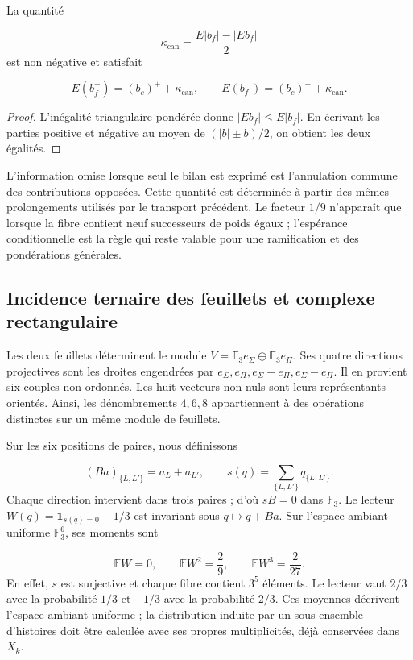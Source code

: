 \begin{proposition}
\label{iv:cont:cancelacion}
La quantité

\[
\kappa_{\mathrm{can}}=
\frac{E|b_f|-|Eb_f|}{2}
\]
est non négative et satisfait

\[
E(b_f^+)=(b_c)^++\kappa_{\mathrm{can}},
\qquad
E(b_f^-)=(b_c)^-+\kappa_{\mathrm{can}}.
\]
\end{proposition}
\begin{proof}
L'inégalité triangulaire pondérée donne \(|Eb_f|\leq E|b_f|\). En écrivant les parties positive et négative au moyen de \((|b|\pm b)/2\), on obtient les deux égalités.
\end{proof}

L’information omise lorsque seul le bilan est exprimé est l’annulation commune des contributions opposées. Cette quantité est déterminée à partir des mêmes prolongements utilisés par le transport précédent. Le facteur \(1/9\) n’apparaît que lorsque la fibre contient neuf successeurs de poids égaux ; l’espérance conditionnelle est la règle qui reste valable pour une ramification et des pondérations générales.

\subsection{Incidence ternaire des feuillets et complexe rectangulaire}
\label{iv:cont:incidencia-rectangular}
Les deux feuillets déterminent le module \(V=\mathbb F_3e_\Sigma\oplus\mathbb F_3e_\Pi\). Ses quatre directions projectives sont les droites engendrées par \(e_\Sigma,e_\Pi,e_\Sigma+e_\Pi,e_\Sigma-e_\Pi\). Il en provient six couples non ordonnés. Les huit vecteurs non nuls sont leurs représentants orientés. Ainsi, les dénombrements \(4,6,8\) appartiennent à des opérations distinctes sur un même module de feuillets.

Sur les six positions de paires, nous définissons

\[
(Ba)_{\{L,L'\}}=a_L+a_{L'},
\qquad
s(q)=\sum_{\{L,L'\}}q_{\{L,L'\}}.
\]
Chaque direction intervient dans trois paires ; d'où \(sB=0\) dans \(\mathbb F_3\). Le lecteur \(W(q)=\mathbf1_{s(q)=0}-1/3\) est invariant sous \(q\mapsto q+Ba\). Sur l'espace ambiant uniforme \(\mathbb F_3^6\), ses moments sont

\[
\mathbb EW=0,\qquad
\mathbb EW^2=\frac29,\qquad
\mathbb EW^3=\frac2{27}.
\]
En effet, \(s\) est surjective et chaque fibre contient \(3^5\) éléments. Le lecteur vaut \(2/3\) avec la probabilité \(1/3\) et \(-1/3\) avec la probabilité \(2/3\). Ces moyennes décrivent l'espace ambiant uniforme ; la distribution induite par un sous-ensemble d'histoires doit être calculée avec ses propres multiplicités, déjà conservées dans \(X_k\).

